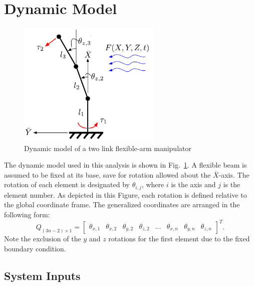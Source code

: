\documentclass[letterpaper,10pt,conference]{ieeeconf}   %
\begin{document}
\section{Dynamic Model}
\label{sec:intro}
%
\begin{figure}[t!] 
\begin{center}
\includegraphics[width = 2.7in]{Figures/Model} 
\caption{Dynamic model of a two link flexible-arm manipulator} 
\label{fig:model}
\end{center}
\vspace{0.1in}
\end{figure}
%
The dynamic model used in this analysis is shown in Fig.~\ref{fig:model}. A flexible beam is assumed to be fixed at its base, save for rotation allowed about the $\bar{X}$-axis. The rotation of each element is designated by $\theta_{i,j}$, where $i$ is the axis and $j$ is the element number. As depicted in this Figure, each rotation is defined relative to the global coordinate frame. The generalized coordinates are arranged in the following form:
%
\begin{equation}
\label{eq:nodaldisp}
Q_{(3n - 2) \times 1} = 
\begin{bmatrix}
 \theta_{x,1} & 
 \theta_{x,2} &
 \theta_{y,2} & 
 \theta_{z,2} &  
 \dots & 
 \theta_{x,n} & 
 \theta_{y,n} & 
 \theta_{z,n}
\end{bmatrix}^T.
\end{equation}
%
Note the exclusion of the $y$ and $z$ rotations for the first element due to the fixed boundary condition. 

\subsection{System Inputs}
\label{sec:inputs}
\end{document}
